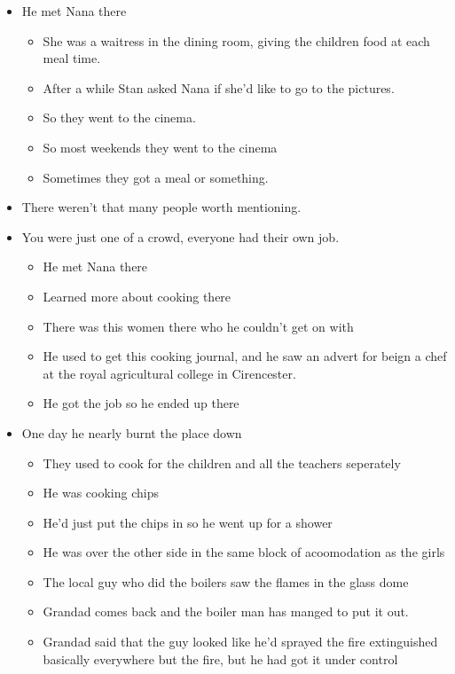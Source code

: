 \documentclass[10pt,twocolumn,letterpaper]{article}
\begin{document}
\begin{itemize}
    \item He met Nana there
          \begin{itemize}
              \item She was a waitress in the dining room, giving the children food at each meal time.
              \item After a while Stan asked Nana if she'd like to go to the pictures.
              \item So they went to the cinema.
              \item So most weekends they went to the cinema
              \item Sometimes they got a meal or something.
          \end{itemize}
    \item There weren't that many people worth mentioning.
    \item You were just one of a crowd, everyone had their own job.
          \begin{itemize}
              \item He met Nana there
              \item Learned more about cooking there
              \item There was this women there who he couldn't get on with
              \item He used to get this cooking journal, and he saw an advert for beign a chef at the royal agricultural college in Cirencester.
              \item He got the job so he ended up there
          \end{itemize}
    \item One day he nearly burnt the place down
          \begin{itemize}
              \item They used to cook for the children and all the teachers seperately
              \item He was cooking chips
              \item He'd just put the chips in so he went up for a shower
              \item He was over the other side in the same block of acoomodation as the girls
              \item The local guy who did the boilers saw the flames in the glass dome
              \item Grandad comes back and the boiler man has manged to put it out.
              \item Grandad said that the guy looked like he'd sprayed the fire extinguished basically everywhere but the fire, but he had got it under control

\end{itemize}
\end{itemize}
\end{document}
